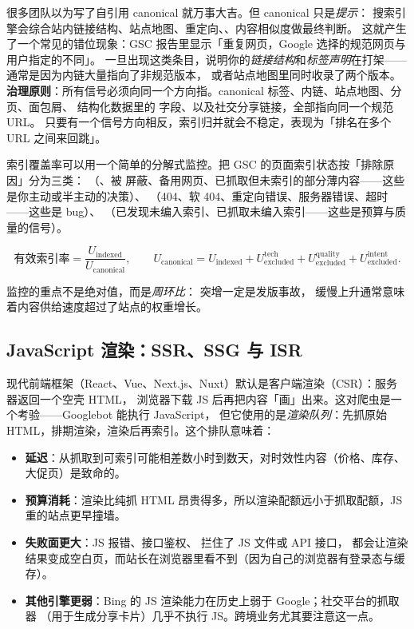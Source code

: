 \begin{insight}
很多团队以为写了自引用 canonical 就万事大吉。但 canonical 只是\emph{提示}：
搜索引擎会综合站内链接结构、站点地图、重定向、、内容相似度做最终判断。
这就产生了一个常见的错位现象：GSC 报告里显示「重复网页，Google 选择的规范网页与用户指定的不同」。
一旦出现这类条目，说明你的\emph{链接结构}和\emph{标签声明}在打架——通常是因为内链大量指向了非规范版本，
或者站点地图里同时收录了两个版本。
\textbf{治理原则}：所有信号必须向同一个方向指。canonical 标签、内链、站点地图、分页、面包屑、
结构化数据里的  字段、以及社交分享链接，全部指向同一个规范 URL。
只要有一个信号方向相反，索引归并就会不稳定，表现为「排名在多个 URL 之间来回跳」。
\end{insight}

索引覆盖率可以用一个简单的分解式监控。把 GSC 的页面索引状态按「排除原因」分为三类：
（、被  屏蔽、备用网页、已抓取但未索引的部分薄内容——这些是你主动或半主动的决策）、
（404、软 404、重定向错误、服务器错误、超时——这些是 bug）、
（已发现未编入索引、已抓取未编入索引——这些是预算与质量的信号）。

\begin{equation}
\text{有效索引率} = \frac{U_{\text{indexed}}}{U_{\text{canonical}}} ,
\qquad
U_{\text{canonical}} = U_{\text{indexed}} + U_{\text{excluded}}^{\text{tech}} + U_{\text{excluded}}^{\text{quality}} + U_{\text{excluded}}^{\text{intent}} .
\label{eq:indexcoverage}
\end{equation}

监控的重点不是绝对值，而是\emph{周环比}： 突增一定是发版事故，
 缓慢上升通常意味着内容供给速度超过了站点的权重增长。

\subsection{JavaScript 渲染：SSR、SSG 与 ISR}

现代前端框架（React、Vue、Next.js、Nuxt）默认是客户端渲染（CSR）：服务器返回一个空壳 HTML，
浏览器下载 JS 后再把内容「画」出来。这对爬虫是一个考验——Googlebot 能执行 JavaScript，
但它使用的是\emph{渲染队列}：先抓原始 HTML，排期渲染，渲染后再索引。这个排队意味着：

\begin{itemize}
  \item \textbf{延迟}：从抓取到可索引可能相差数小时到数天，对时效性内容（价格、库存、大促页）是致命的。
  \item \textbf{预算消耗}：渲染比纯抓 HTML 昂贵得多，所以渲染配额远小于抓取配额，JS 重的站点更早撞墙。
  \item \textbf{失败面更大}：JS 报错、接口鉴权、 拦住了 JS 文件或 API 接口，
        都会让渲染结果变成空白页，而站长在浏览器里看不到（因为自己的浏览器有登录态与缓存）。
  \item \textbf{其他引擎更弱}：Bing 的 JS 渲染能力在历史上弱于 Google；社交平台的抓取器
        （用于生成分享卡片）几乎不执行 JS。跨境业务尤其要注意这一点。
\end{itemize}

